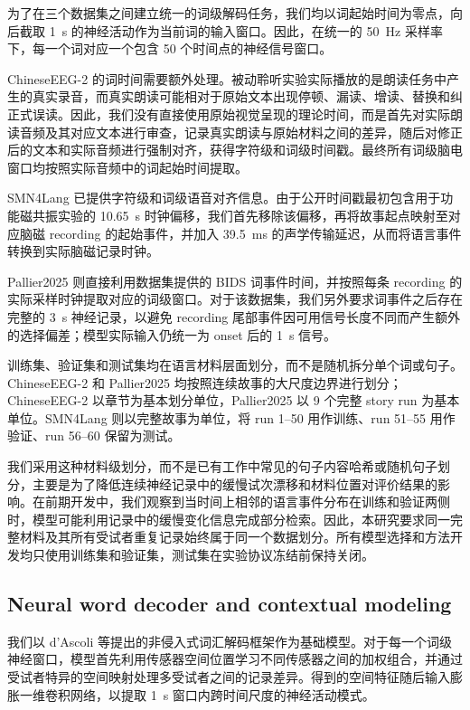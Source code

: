 为了在三个数据集之间建立统一的词级解码任务，我们均以词起始时间为零点，向后截取 1~s 的神经活动作为当前词的输入窗口。因此，在统一的 50~Hz 采样率下，每一个词对应一个包含 50 个时间点的神经信号窗口。

ChineseEEG-2 的词时间需要额外处理。被动聆听实验实际播放的是朗读任务中产生的真实录音，而真实朗读可能相对于原始文本出现停顿、漏读、增读、替换和纠正式误读。因此，我们没有直接使用原始视觉呈现的理论时间，而是首先对实际朗读音频及其对应文本进行审查，记录真实朗读与原始材料之间的差异，随后对修正后的文本和实际音频进行强制对齐，获得字符级和词级时间戳。最终所有词级脑电窗口均按照实际音频中的词起始时间提取。

SMN4Lang 已提供字符级和词级语音对齐信息。由于公开时间戳最初包含用于功能磁共振实验的 10.65~s 时钟偏移，我们首先移除该偏移，再将故事起点映射至对应脑磁 recording 的起始事件，并加入 39.5~ms 的声学传输延迟，从而将语言事件转换到实际脑磁记录时钟。

Pallier2025 则直接利用数据集提供的 BIDS 词事件时间，并按照每条 recording 的实际采样时钟提取对应的词级窗口。对于该数据集，我们另外要求词事件之后存在完整的 3~s 神经记录，以避免 recording 尾部事件因可用信号长度不同而产生额外的选择偏差；模型实际输入仍统一为 onset 后的 1~s 信号。

训练集、验证集和测试集均在语言材料层面划分，而不是随机拆分单个词或句子。ChineseEEG-2 和 Pallier2025 均按照连续故事的大尺度边界进行划分；ChineseEEG-2 以章节为基本划分单位，Pallier2025 以 9 个完整 story run 为基本单位。SMN4Lang 则以完整故事为单位，将 run 1--50 用作训练、run 51--55 用作验证、run 56--60 保留为测试。

我们采用这种材料级划分，而不是已有工作中常见的句子内容哈希或随机句子划分，主要是为了降低连续神经记录中的缓慢试次漂移和材料位置对评价结果的影响。在前期开发中，我们观察到当时间上相邻的语言事件分布在训练和验证两侧时，模型可能利用记录中的缓慢变化信息完成部分检索。因此，本研究要求同一完整材料及其所有受试者重复记录始终属于同一个数据划分。所有模型选择和方法开发均只使用训练集和验证集，测试集在实验协议冻结前保持关闭。

\subsection{Neural word decoder and contextual modeling}

我们以 d'Ascoli 等提出的非侵入式词汇解码框架作为基础模型\cite{dascoli2025worddecoding}。对于每一个词级神经窗口，模型首先利用传感器空间位置学习不同传感器之间的加权组合，并通过受试者特异的空间映射处理多受试者之间的记录差异。得到的空间特征随后输入膨胀一维卷积网络，以提取 1~s 窗口内跨时间尺度的神经活动模式。

